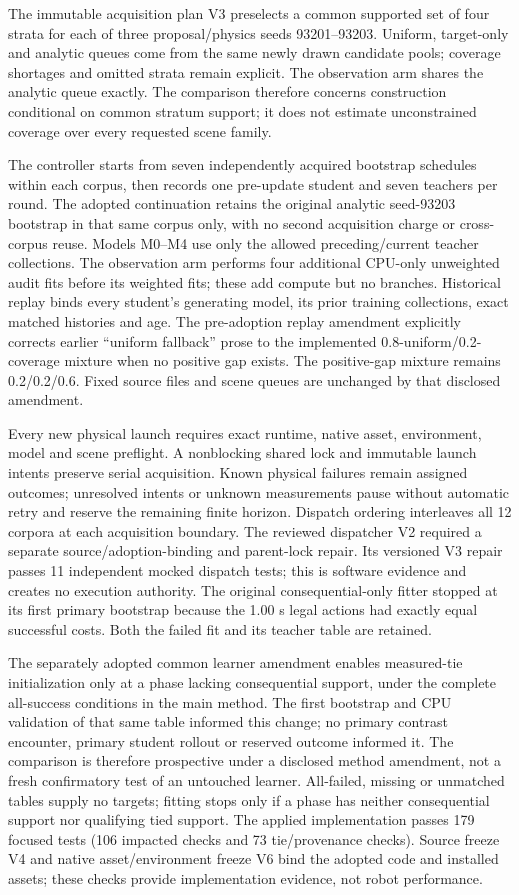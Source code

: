 The immutable acquisition plan V3 preselects a common supported set of four
strata for each of three proposal/physics seeds 93201--93203. Uniform,
target-only and analytic queues come from the same newly drawn candidate pools;
coverage shortages and omitted strata remain explicit. The observation arm
shares the analytic queue exactly. The comparison therefore concerns construction
conditional on common stratum support; it does not estimate unconstrained
coverage over every requested scene family.

The controller starts from seven independently acquired bootstrap schedules
within each corpus, then records one pre-update student and seven teachers per
round. The adopted continuation retains the original analytic seed-93203
bootstrap in that same corpus only, with no second acquisition charge or
cross-corpus reuse. Models M0--M4 use only the
allowed preceding/current teacher collections. The observation arm performs four
additional CPU-only unweighted audit fits before its weighted fits; these add
compute but no branches. Historical replay binds every student's generating
model, its prior training collections, exact matched histories and age. The
pre-adoption replay amendment explicitly corrects earlier ``uniform fallback''
prose to the implemented 0.8-uniform/0.2-coverage mixture when no positive gap
exists. The positive-gap mixture remains 0.2/0.2/0.6. Fixed source files and scene
queues are unchanged by that disclosed amendment.

Every new physical launch requires exact runtime, native asset, environment,
model and scene preflight. A nonblocking shared lock and immutable launch intents
preserve serial acquisition. Known physical failures remain assigned outcomes;
unresolved intents or unknown measurements pause without automatic retry and
reserve the remaining finite horizon. Dispatch ordering interleaves all 12
corpora at each acquisition boundary. The reviewed dispatcher V2 required a
separate source/adoption-binding and parent-lock repair. Its versioned V3 repair
passes 11 independent mocked dispatch tests; this is software evidence and creates
no execution authority. The original consequential-only fitter stopped at its
first primary bootstrap because the 1.00 s legal actions had exactly equal
successful costs. Both the failed fit and its teacher table are retained.

The separately adopted common learner amendment enables measured-tie
initialization only at a phase lacking consequential support, under the complete
all-success conditions in the main method. The first bootstrap and CPU validation
of that same table informed this change; no primary contrast encounter, primary
student rollout or reserved outcome informed it. The comparison is therefore
prospective under a disclosed method amendment, not a fresh confirmatory test of
an untouched learner. All-failed, missing or unmatched tables supply no targets;
fitting stops only if a phase has neither consequential support nor qualifying
tied support. The applied implementation passes 179 focused tests
(106 impacted checks and 73 tie/provenance checks). Source freeze V4 and native
asset/environment freeze V6 bind the adopted code and installed assets; these
checks provide implementation evidence, not robot performance.


